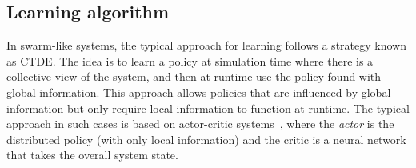 \documentclass[conference]{IEEEtran}
\begin{document}
\subsection{Learning algorithm}
In swarm-like systems, 
 the typical approach for learning follows a strategy known as \ac{CTDE}.  
The idea is to learn a policy at simulation time where there is a collective view of the system, 
 and then at runtime use the policy found with global information. 
This approach allows policies that are influenced by global information but only require local information to function at runtime. 
%
The typical approach in such cases is based on actor-critic systems~\cite{DBLP:conf/nips/LoweWTHAM17,wu2022more,song2022ctds,song2022centralized},
  where the \emph{actor} is the distributed policy (with only local information) and the critic is a neural network that takes the overall system state.
\end{document}
